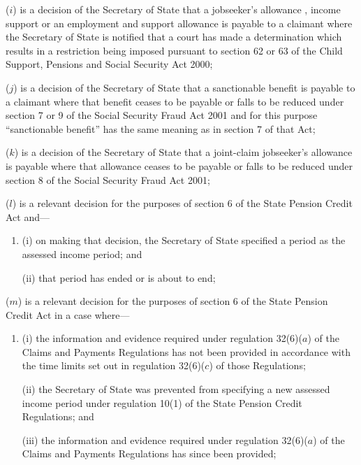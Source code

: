 \documentclass[12pt,a4paper]{article}
\begin{document}
\begin{enumerate}
($i$) is a decision of the Secretary of State that a jobseeker’s allowance%
, income support or an employment and support allowance  %
is payable to a claimant where the Secretary of State is notified that a court has made a determination which results in a restriction being imposed pursuant to section 62 or 63 of the Child Support, Pensions and Social Security Act 2000;

($j$) is a decision of the Secretary of State that a sanctionable benefit is payable to a claimant where that benefit ceases to be payable or falls to be reduced under section 7 or 9 of the Social Security Fraud Act 2001 and for this purpose “sanctionable benefit” has the same meaning as in section 7 of that Act;

($k$) is a decision of the Secretary of State that a joint-claim jobseeker’s allowance is payable where that allowance ceases to be payable or falls to be reduced under section 8 of the Social Security Fraud Act 2001;

($l$) is a relevant decision for the purposes of section 6 of the State Pension Credit Act and—
\begin{enumerate}\item[]
(i) on making that decision, the Secretary of State specified a period as the assessed income period; and

(ii) that period has ended or is about to end;
\end{enumerate}

($m$) is a relevant decision for the purposes of section 6 of the State Pension Credit Act in a case where—
\begin{enumerate}\item[]
(i) the information and evidence required under regulation 32(6)($a$)  of the Claims and Payments Regulations has not been provided in accordance with the time limits set out in regulation 32(6)($c$)  of those Regulations;

(ii) the Secretary of State was prevented from specifying a new assessed income period under regulation 10(1) of the State Pension Credit Regulations; and

\begin{sloppypar}
(iii) the information and evidence required under regulation 32(6)($a$)  of the Claims and Payments Regulations has since been provided;
\end{sloppypar}
\end{enumerate}


\end{enumerate}
\end{document}
